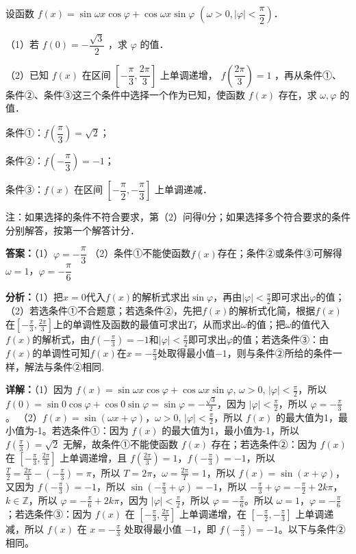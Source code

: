 \begin{question}[points=13]
设函数 $f(x) = \sin\omega x\cos\varphi + \cos\omega x\sin\varphi$ $\left(\omega>0, |\varphi|<\dfrac{\pi}{2}\right)$．

（1）若 $f(0) = -\dfrac{\sqrt{3}}{2}$ ，求 $\varphi$ 的值．

（2）已知 $f(x)$ 在区间 $\left[-\dfrac{\pi}{3}, \dfrac{2\pi}{3}\right]$ 上单调递增， $f\left(\dfrac{2\pi}{3}\right)=1$ ，再从条件①、条件②、条件③这三个条件中选择一个作为已知，使函数 $f(x)$ 存在，求 $\omega, \varphi$ 的值．

条件①：$f\left(\dfrac{\pi}{3}\right)=\sqrt{2}$；

条件②：$f\left(-\dfrac{\pi}{3}\right)=-1$；

条件③：$f(x)$ 在区间 $\left[-\dfrac{\pi}{2}, -\dfrac{\pi}{3}\right]$ 上单调递减．

注：如果选择的条件不符合要求，第（2）问得0分；如果选择多个符合要求的条件分别解答，按第一个解答计分．
\begin{solution}
\textbf{答案：}（1）$\varphi=-\dfrac{\pi}{3}$ （2）条件①不能使函数$f(x)$存在；条件②或条件③可解得$\omega=1$，$\varphi=-\dfrac{\pi}{6}$

\textbf{分析：}（1）把$x=0$代入$f(x)$的解析式求出$\sin\varphi$，再由$|\varphi|<\frac{\pi}{2}$即可求出$\varphi$的值；（2）若选条件①不合题意；若选条件②，先把$f(x)$的解析式化简，根据$f(x)$在$[-\frac{\pi}{3},\frac{2\pi}{3}]$上的单调性及函数的最值可求出$T$，从而求出$\omega$的值；把$\omega$的值代入$f(x)$的解析式，由$f(-\frac{\pi}{3})=-1$和$|\varphi|<\frac{\pi}{2}$即可求出$\varphi$的值；若选条件③：由$f(x)$的单调性可知$f(x)$在$x=-\frac{\pi}{3}$处取得最小值$-1$，则与条件②所给的条件一样，解法与条件②相同.

\textbf{详解：}（1）因为 $f(x)=\sin\omega x\cos\varphi+\cos\omega x\sin\varphi$, $\omega>0$, $|\varphi|<\frac{\pi}{2}$，所以 $f(0)=\sin0\cos\varphi+\cos0\sin\varphi=\sin\varphi=-\frac{\sqrt{3}}{2}$，因为 $|\varphi|<\frac{\pi}{2}$，所以 $\varphi=-\frac{\pi}{3}$。
（2）$f(x)=\sin(\omega x+\varphi)$，$\omega>0$, $|\varphi|<\frac{\pi}{2}$，所以 $f(x)$ 的最大值为1，最小值为-1。若选条件①：因为 $f(x)$ 的最大值为1，最小值为-1，所以 $f(\frac{\pi}{3})=\sqrt{2}$ 无解，故条件①不能使函数 $f(x)$ 存在；若选条件②：因为 $f(x)$ 在 $[-\frac{\pi}{3},\frac{2\pi}{3}]$ 上单调递增，且 $f(\frac{2\pi}{3})=1$，$f(-\frac{\pi}{3})=-1$，所以 $\frac{T}{2}=\frac{2\pi}{3}-(-\frac{\pi}{3})=\pi$，所以 $T=2\pi$，$\omega=\frac{2\pi}{T}=1$，所以 $f(x)=\sin(x+\varphi)$，又因为 $f(-\frac{\pi}{3})=-1$，所以 $\sin(-\frac{\pi}{3}+\varphi)=-1$，所以 $-\frac{\pi}{3}+\varphi=-\frac{\pi}{2}+2k\pi$，$k\in\mathbb{Z}$，所以 $\varphi=-\frac{\pi}{6}+2k\pi$，因为 $|\varphi|<\frac{\pi}{2}$，所以 $\varphi=-\frac{\pi}{6}$。所以 $\omega=1$，$\varphi=-\frac{\pi}{6}$；若选条件③：因为 $f(x)$ 在 $[-\frac{\pi}{3},\frac{2\pi}{3}]$ 上单调递增，在 $[-\frac{\pi}{2},-\frac{\pi}{3}]$ 上单调递减，所以 $f(x)$ 在 $x=-\frac{\pi}{3}$ 处取得最小值 $-1$，即 $f(-\frac{\pi}{3})=-1$。以下与条件②相同。
\end{solution}
\end{question}

